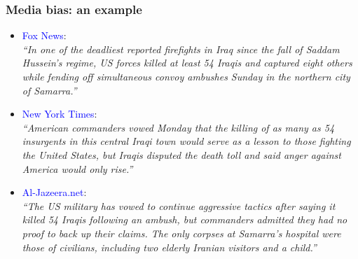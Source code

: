 \documentclass[english]{beamer}
\begin{document}
\begin{frame}

\frametitle{Media bias: an example}

\begin{itemize}
\item \textcolor{blue}{Fox News}:\\
\vspace{2pt}
\textit{``In one of the deadliest reported firefights in Iraq since the fall of Saddam Hussein's regime, US forces killed at least 54 Iraqis and captured eight others while fending off simultaneous convoy ambushes Sunday in the northern city of Samarra.''}
\end{itemize}

\vspace{3pt}

\begin{itemize}
\item \textcolor{blue}{New York Times}:\\
\vspace{3pt}
\textit{``American commanders vowed Monday that the killing of as many as 54 insurgents in this central Iraqi town would serve as a lesson to those fighting the United States, but Iraqis disputed the death toll and said anger against America would only rise.''}
\end{itemize}

\vspace{3pt}

\begin{itemize}
\item \textcolor{blue}{Al-Jazeera.net}:\\
\vspace{2pt}
\textit{``The US military has vowed to continue aggressive tactics after saying it killed 54 Iraqis following an ambush, but commanders admitted they had no proof to back up their claims. The only corpses at Samarra's hospital were those of civilians, including two elderly Iranian visitors and a child.''}
\end{itemize}

\end{frame}
\end{document}
